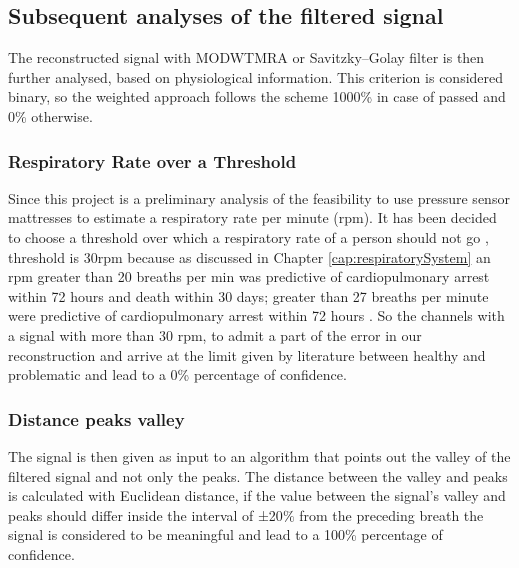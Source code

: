 \vspace*{0.3cm}



\subsection{Subsequent analyses of the filtered signal}
The reconstructed signal with MODWTMRA or Savitzky–Golay filter is then further analysed, based on physiological information. This criterion is considered binary, so the weighted approach follows the scheme 1000\% in case of passed and 0\% otherwise.

\subsubsection{Respiratory Rate over a Threshold}\label{threshold}
Since this project is a preliminary analysis of the feasibility to use pressure sensor mattresses to estimate a respiratory rate per minute (rpm). It has been decided to choose a threshold over which a respiratory rate of a person should not go %
, threshold is 30rpm because as discussed in Chapter \ref{cap:respiratorySystem} an rpm greater than 20 breaths per min was predictive of cardiopulmonary arrest within 72 hours and death within 30 days\cite{Hong2013HowPatients}; greater than 27 breaths per minute were predictive of cardiopulmonary arrest within 72 hours \cite{Fieselmann1993RespiratoryInpatients}.
So %
the channels with a signal with more than 30 rpm, to admit a part of the error in our reconstruction and arrive at the limit given by literature between healthy and problematic and lead to a 0\% percentage of confidence.

\subsubsection{Distance peaks valley} \label{cap:Euclidian}
The signal is then given as input to an algorithm that points out the valley of the filtered signal and not only the peaks.
The distance between the valley and peaks is calculated with Euclidean distance, if the value between the signal's valley and peaks should differ inside the interval of ±20$\%$ from the preceding breath the signal is considered to be meaningful and lead to a 100\% percentage of confidence.
\vspace*{0.5cm}

